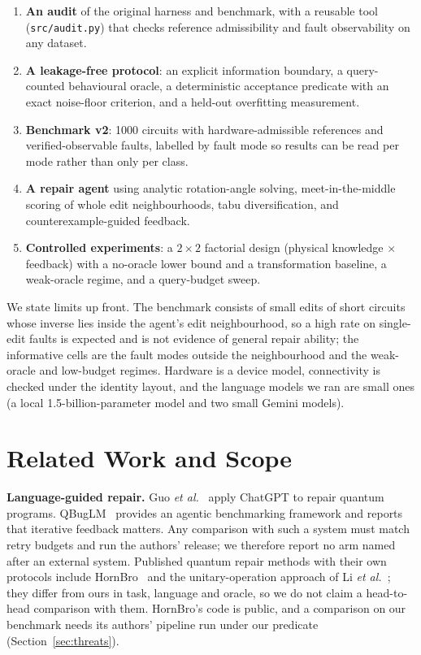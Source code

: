 \documentclass[journal]{IEEEtran}
\begin{document}
\begin{enumerate}
\item \textbf{An audit} of the original harness and benchmark, with a reusable
tool (\texttt{src/audit.py}) that checks reference admissibility and fault
observability on any dataset.
\item \textbf{A leakage-free protocol}: an explicit information boundary, a
query-counted behavioural oracle, a deterministic acceptance predicate with an
exact noise-floor criterion, and a held-out overfitting measurement.
\item \textbf{Benchmark v2}: 1000 circuits with hardware-admissible references and
verified-observable faults, labelled by fault mode so results can be read per
mode rather than only per class.
\item \textbf{A repair agent} using analytic rotation-angle solving,
meet-in-the-middle scoring of whole edit neighbourhoods, tabu diversification,
and counterexample-guided feedback.
\item \textbf{Controlled experiments}: a $2\times2$ factorial design
(physical knowledge $\times$ feedback) with a no-oracle lower bound and a
transformation baseline, a weak-oracle regime, and a query-budget sweep.
\end{enumerate}

We state limits up front. The benchmark consists of small edits of short
circuits whose inverse lies inside the agent's edit neighbourhood, so a high rate
on single-edit faults is expected and is not evidence of general repair ability;
the informative cells are the fault modes outside the neighbourhood and the
weak-oracle and low-budget regimes. Hardware is a device model, connectivity is
checked under the identity layout, and the language models we ran are small ones (a local 1.5-billion-parameter model and two small Gemini models).

\section{Related Work and Scope}

\textbf{Language-guided repair.} Guo \emph{et al.}~\cite{guo2024chatgpt} apply
ChatGPT to repair quantum programs. QBugLM~\cite{pham2026qbuglm} provides an
agentic benchmarking framework and reports that iterative feedback matters. Any
comparison with such a system must match retry budgets and run the authors'
release; we therefore report no arm named after an external system. Published
quantum repair methods with their own protocols include HornBro~\cite{tan2025hornbro}
and the unitary-operation approach of Li \emph{et al.}~\cite{li2024unitar}; they
differ from ours in task, language and oracle, so we do not claim a head-to-head
comparison with them. HornBro's code is public, and a comparison on our benchmark
needs its authors' pipeline run under our predicate (Section~\ref{sec:threats}).
\end{document}
